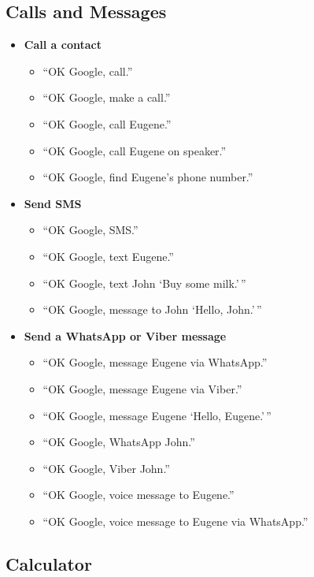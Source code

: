 \documentclass[
  jou,
  floatsintext,
  longtable,
  a4paper,
  nolmodern,
  notxfonts,
  notimes,
  12pt,
  colorlinks=true,linkcolor=blue,citecolor=blue,urlcolor=blue]{apa7}
\providecommand{\tightlist}{%
  \setlength{\itemsep}{0pt}\setlength{\parskip}{0pt}}
\begin{document}
\subsection{Calls and Messages}\label{calls-and-messages}

\begin{itemize}
\tightlist
\item
  \textbf{Call a contact}

  \begin{itemize}
  \tightlist
  \item
    ``OK Google, call.''
  \item
    ``OK Google, make a call.''
  \item
    ``OK Google, call Eugene.''
  \item
    ``OK Google, call Eugene on speaker.''
  \item
    ``OK Google, find Eugene's phone number.''
  \end{itemize}
\item
  \textbf{Send SMS}

  \begin{itemize}
  \tightlist
  \item
    ``OK Google, SMS.''
  \item
    ``OK Google, text Eugene.''
  \item
    ``OK Google, text John `Buy some milk.'\,''
  \item
    ``OK Google, message to John `Hello, John.'\,''
  \end{itemize}
\item
  \textbf{Send a WhatsApp or Viber message}

  \begin{itemize}
  \tightlist
  \item
    ``OK Google, message Eugene via WhatsApp.''
  \item
    ``OK Google, message Eugene via Viber.''
  \item
    ``OK Google, message Eugene `Hello, Eugene.'\,''
  \item
    ``OK Google, WhatsApp John.''
  \item
    ``OK Google, Viber John.''
  \item
    ``OK Google, voice message to Eugene.''
  \item
    ``OK Google, voice message to Eugene via WhatsApp.''
  \end{itemize}
\end{itemize}

\subsection{Calculator}\label{calculator}
\end{document}
